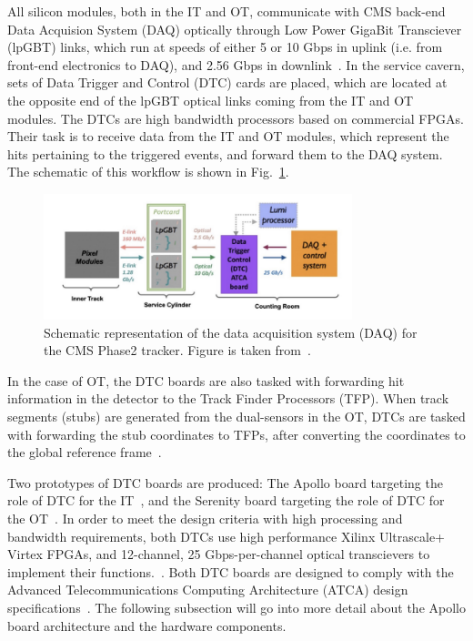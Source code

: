 All silicon modules, both in the IT and OT, communicate with CMS back-end Data Acquision System (DAQ) 
optically through Low Power GigaBit Transciever (lpGBT) links, which run at speeds of either 5 or 10 Gbps
in uplink (i.e. from front-end electronics to DAQ), and 2.56 Gbps in downlink~\cite{CMS:TrackerUpgradeStatus}. 
In the service cavern, sets of Data Trigger and Control (DTC) cards are placed, 
which are located at the opposite end of the lpGBT optical links
coming from the IT and OT modules. The DTCs are high bandwidth processors based on commercial FPGAs. Their task
is to receive data from the IT and OT modules, which represent the hits pertaining to the triggered events, and
forward them to the DAQ system. The schematic of this workflow is shown in Fig.~\ref{fig:daq_schematic}.

\begin{figure}[htbp]
    \centering
    \includegraphics[width=0.8\textwidth]{TrackerUpgrade/daq_schematic.png}
    \caption{Schematic representation of the data acquisition system (DAQ) for the CMS Phase2 tracker.
    Figure is taken from~\cite{CMS:Phase2TrackerUpgrade}.}
    \label{fig:daq_schematic}
\end{figure}

In the case of OT, the DTC boards are also tasked with forwarding hit information in the detector to the Track
Finder Processors (TFP). When track segments (stubs) are generated from the dual-sensors in the OT, 
DTCs are tasked with forwarding the stub coordinates to TFPs, after converting the coordinates 
to the global reference frame~\cite{CMS:TrackerUpgradeStatus}. 

Two prototypes of DTC boards are produced: The Apollo board targeting the role of DTC for the IT~\cite{CMS:ApolloPaper},
and the Serenity board targeting the role of DTC for the OT~\cite{CMS:SerenityPaper}. In order to meet the design
criteria with high processing and bandwidth requirements, both DTCs use high performance Xilinx Ultrascale+ Virtex
FPGAs, and 12-channel, 25 Gbps-per-channel optical transcievers to implement their functions.~\cite{CMS:TrackerUpgradeStatus}.
Both DTC boards are designed to comply with the Advanced Telecommunications Computing Architecture (ATCA) design 
specifications~\cite{PICMG:ATCA}.
The following subsection will go into more detail about the Apollo board architecture and the hardware components.

